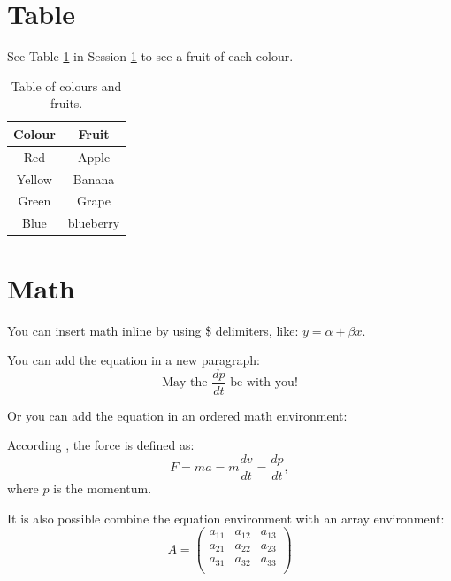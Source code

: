 \documentclass{article}
\begin{document}
\section{Table}\label{sec:tab}
\blindtext[1] See Table \ref{tab:col_fruit} in Session \ref{sec:tab} to see a fruit of each colour.
\begin{table}[h]
    \centering
    \begin{tabular}{|c||c|}\hline  %
        Colour & Fruit     \\ \hline \hline %
        Red    & Apple     \\  
        Yellow & Banana    \\
        Green  & Grape     \\
        Blue   & blueberry \\ \hline
    \end{tabular}
    \caption{Table of colours and fruits.}
    \label{tab:col_fruit}
\end{table}

\blindtext[1]


\section{Math}\label{sec:math}
You can insert math inline by using \$ delimiters, like: $y = \alpha + \beta x$.

You can add the equation in a new paragraph:
\[
\text{May the } \frac{d p}{d t} \text{ be with you!}
\]

Or you can add the equation in an ordered math environment:

According \cite{newton1850}, the force is defined as:
\begin{equation}
    F = ma = m\frac{dv}{dt} = \frac{dp}{dt},
\end{equation}
where $p$ is the momentum.

It is also possible combine the equation environment with an array environment:
\begin{equation}
    A = \left(
        \begin{array}{ccc}
            a_{11} & a_{12} & a_{13} \\
            a_{21} & a_{22} & a_{23} \\
            a_{31} & a_{32} & a_{33} \\
        \end{array}
    \right)
\end{equation}


\end{document}
